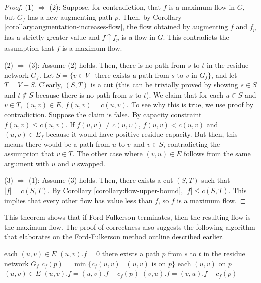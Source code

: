 \begin{proof}
    \hfill

    (1) $\Rightarrow$ (2): Suppose, for contradiction, that $f$ is a maximum flow in $G$, but $G_f$ has a new augmenting path $p$. Then, by Corollary \ref{corollary:augmentation-increases-flow}, the flow obtained by augmenting $f$ and $f_p$ has a strictly greater value and $f \uparrow f_p$ is a flow in $G$. This contradicts the assumption that $f$ is a maximum flow. 

    (2) $\Rightarrow$ (3): Assume (2) holds. Then, there is no path from $s$ to $t$ in the residue network $G_f$. Let $S = \{ v \in V \mid \text{there exists a path from $s$ to $v$ in $G_f$} \}$, and let $T = V-S$. Clearly, $(S,T)$ is a cut (this can be trivially proved by showing $s \in S$ and $t \not\in S$ because there is no path from $s$ to $t$). We claim that for each $u\in S$ and $v \in T$, $(u,v) \in E$, $f(u,v) = c(u,v)$. To see why this is true, we use proof by contradiction. Suppose the claim is false. By capacity constraint $f(u,v) \leq c(u,v)$. If $f(u,v) \neq c(u,v)$, $f(u,v) < c(u,v)$ and $(u,v) \in E_f$ because it would have positive residue capacity. But then, this means there would be a path from $u$ to $v$ and $v \in S$, contradicting the assumption that $v \in T$. The other case where $(v,u) \in E$ follows from the same argument with $u$ and $v$ swapped.

    (3) $\Rightarrow$ (1): Assume (3) holds. Then, there exists a cut $(S,T)$ such that $|f| = c(S,T)$. By Corollary \ref{corollary:flow-upper-bound}, $|f| \leq c(S,T)$. This implies that every other flow has value less than $f$, so $f$ is a maximum flow.
\end{proof}

This theorem shows that if Ford-Fulkerson terminates, then the resulting flow is the maximum flow. The proof of correctness also suggests the following algorithm that elaborates on the Ford-Fulkerson method outline described earlier.

\begin{codebox}
    \li \For each $(u,v) \in E$ \Do
        \li $(u,v).f = 0$ 
    \End
    \li \While there exists a path $p$ from $s$ to $t$ in the residue network $G_f$ \Do
        \li $c_f(p) = \min \{c_f(u,v) \mid \text{$(u,v)$ is on $p$} \}$ 
        \li \For each $(u,v)$ on $p$ \Do {}
            \li \If $(u,v) \in E$ \Then
                \li $(u,v).f = (u,v).f + c_f(p)$
            \li \Else $(v,u).f = (v,u).f - c_f(p)$
            \End
        \End
    \End
\end{codebox}

